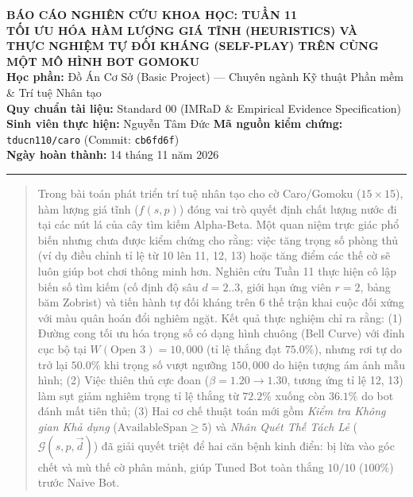 \documentclass[11pt,a4paper]{article}
\begin{document}
\begin{center}
    {\Large\bfseries\sffamily\color{primary} BÁO CÁO NGHIÊN CỨU KHOA HỌC: TUẦN 11}\\[4pt]
    {\large\bfseries\sffamily\color{secondary} TỐI ƯU HÓA HÀM LƯỢNG GIÁ TĨNH (HEURISTICS) VÀ\\THỰC NGHIỆM TỰ ĐỐI KHÁNG (SELF-PLAY) TRÊN CÙNG MỘT MÔ HÌNH BOT GOMOKU}\\[6pt]
    
    \vspace{4pt}
    {\small
        \textbf{Học phần:} Đồ Án Cơ Sở (Basic Project) --- Chuyên ngành Kỹ thuật Phần mềm \& Trí tuệ Nhân tạo\\
        \textbf{Quy chuẩn tài liệu:} Standard 00 (IMRaD \& Empirical Evidence Specification)\\
        \textbf{Sinh viên thực hiện:} Nguyễn Tâm Đức \quad\textbar\quad \textbf{Mã nguồn kiểm chứng:} \texttt{tducn110/caro} (Commit: \texttt{cb6fd6f})\\
        \textbf{Ngày hoàn thành:} 14 tháng 11 năm 2026
    }
    \vspace{6pt}
    \hrule height 1pt
\end{center}

\vspace{2pt}

\begin{abstract}
\noindent Trong bài toán phát triển trí tuệ nhân tạo cho cờ Caro/Gomoku ($15 \times 15$), hàm lượng giá tĩnh ($f(s, p)$) đóng vai trò quyết định chất lượng nước đi tại các nút lá của cây tìm kiếm Alpha-Beta. Một quan niệm trực giác phổ biến nhưng chưa được kiểm chứng cho rằng: việc tăng trọng số phòng thủ (ví dụ điều chỉnh tỉ lệ từ 10 lên 11, 12, 13) hoặc tăng điểm các thế cờ sẽ luôn giúp bot chơi thông minh hơn. Nghiên cứu Tuần 11 thực hiện cô lập biến số tìm kiếm (cố định độ sâu $d=2..3$, giới hạn ứng viên $r=2$, bảng băm Zobrist) và tiến hành tự đối kháng trên 6 thế trận khai cuộc đối xứng với màu quân hoán đổi nghiêm ngặt. Kết quả thực nghiệm chỉ ra rằng: (1) Đường cong tối ưu hóa trọng số có dạng hình chuông (Bell Curve) với đỉnh cục bộ tại $W(\text{Open 3}) = 10{,}000$ (tỉ lệ thắng đạt $75.0\%$), nhưng rơi tự do trở lại $50.0\%$ khi trọng số vượt ngưỡng $150{,}000$ do hiện tượng ám ảnh mẫu hình; (2) Việc thiên thủ cực đoan ($\beta = 1.20 \to 1.30$, tương ứng tỉ lệ 12, 13) làm sụt giảm nghiêm trọng tỉ lệ thắng từ $72.2\%$ xuống còn $36.1\%$ do bot đánh mất tiên thủ; (3) Hai cơ chế thuật toán mới gồm \textit{Kiểm tra Không gian Khả dụng} ($\text{AvailableSpan} \ge 5$) và \textit{Nhân Quét Thế Tách Lẻ} ($\mathcal{G}(s, p, \vec{d})$) đã giải quyết triệt để hai căn bệnh kinh điển: bị lừa vào góc chết và mù thế cờ phân mảnh, giúp Tuned Bot toàn thắng $10/10$ ($100\%$) trước Naive Bot.
\end{abstract}
\end{document}
